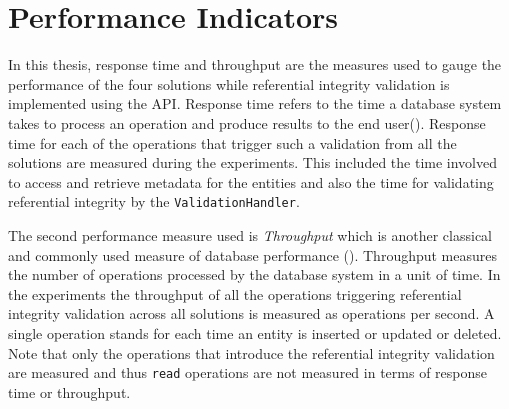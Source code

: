 \section{Performance Indicators} \label{sexp:PerformanceIndicators}

In this thesis,  response time and throughput are the measures used to gauge the
performance of the four solutions while referential integrity validation is
implemented using the \ac{API}. 
Response time refers to the time  a database system takes to process an
operation and produce results to the end user().  
Response time for each of the  operations that trigger such a validation from
all the solutions are measured during the experiments. 
This included the time involved to access and retrieve metadata for the entities
and also the time for validating referential integrity by the
\texttt{ValidationHandler}.  

The second performance measure used is \textit{Throughput} which is another
classical and commonly used measure of database performance ().  Throughput measures the number of operations processed by the
database system in a unit of time.  In the experiments the throughput of all the
operations triggering referential integrity validation across all solutions is
measured as operations per second.  A single operation stands for each time an
entity is inserted or updated or deleted. Note that only the operations that
introduce the referential integrity validation are measured and thus
\texttt{read} operations are not measured in terms of response time or
throughput. 

